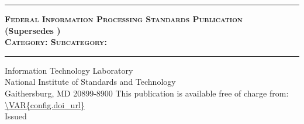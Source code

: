 \documentclass[12pt]{article}
\begin{document}
    \RaggedRight %


\begin{titlepage}

\bfseries\sffamily

\LARGE{\textbf{}}
\vspace{8pt}
\hrule
\vspace{8pt}
\large{\textbf{\textsc{Federal Information Processing Standards Publication}}}\\
\small{\textbf{(Supersedes )}}
\vfill
\Huge{\textbf{}}\\
\vfill
\normalsize{\textbf{\textsc{Category: \hfill Subcategory: }}}
\vspace{8pt}
\hrule
\vfill

Information Technology Laboratory\\
National Institute of Standards and Technology\\
Gaithersburg, MD 20899-8900
\vfill
\normalsize This publication is available free of charge from:\\
\url{\VAR{config.doi_url}}\\
\vfill
\normalsize Issued 
\vfill


\end{titlepage}
\end{document}
